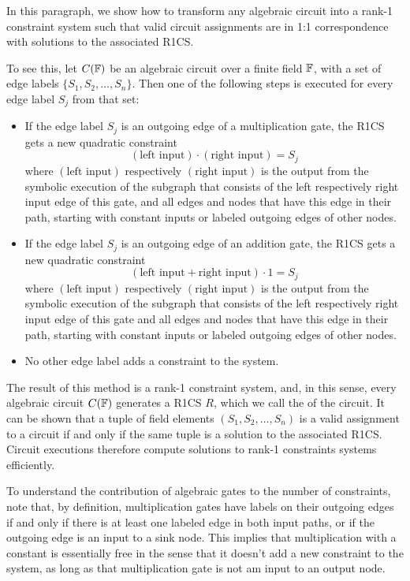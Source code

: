 In this paragraph, we show how to transform any algebraic circuit into a rank-1 constraint system such that valid circuit assignments are in 1:1 correspondence with solutions to the associated R1CS. 

To see this, let $C(\mathbb{F})$ be an algebraic circuit over a finite field $\mathbb{F}$, with a set of edge labels $\{S_1,S_2,\ldots, S_n\}$. Then one of the following steps is executed for every edge label $S_j$ from that set:
\begin{definition}\label{algebraic-gates}
\begin{itemize}
\item If the edge label $S_j$ is an outgoing edge of a multiplication gate, the R1CS gets a new quadratic constraint
\begin{equation}
(\text{left input})\cdot (\text{right input}) = S_j
\end{equation}  
where $(\text{left input})$ respectively $(\text{right input})$ is the output from the symbolic execution of the subgraph that consists of the left respectively right input edge of this gate, and all edges and nodes that have this edge in their path, starting with constant inputs or labeled outgoing edges of other nodes.
\item If the edge label $S_j$ is an outgoing edge of an addition gate, the R1CS gets a new quadratic constraint
\begin{equation}
(\text{left input} + \text{right input})\cdot 1 = S_j
\end{equation}  
where $(\text{left input})$ respectively $(\text{right input})$ is the output from the symbolic execution of the subgraph that consists of the left respectively right input edge of this gate and all edges and nodes that have this edge in their path, starting with constant inputs or labeled outgoing edges of other nodes.
\item No other edge label adds a constraint to the system.
\end{itemize}
\end{definition}
The result of this method is a rank-1 constraint system, and, in this sense, every algebraic circuit $C(\mathbb{F})$ generates a R1CS $R$, which we call the  of the circuit. It can be shown that a tuple of field elements $(S_1,S_2,\ldots, S_n)$ is a valid assignment to a circuit if and only if the same tuple is a solution to the associated R1CS. Circuit executions therefore compute solutions to rank-1 constraints systems efficiently. 

To understand the contribution of algebraic gates to the number of constraints, note that,
by definition, multiplication gates have labels on their outgoing edges if and only if
there is at least one labeled edge in both input paths, or if the outgoing edge is an input to a sink node. This implies that multiplication with a constant is essentially free in the sense that it doesn't add a new constraint to the system, as long as that multiplication gate is not am input to an output node. 

